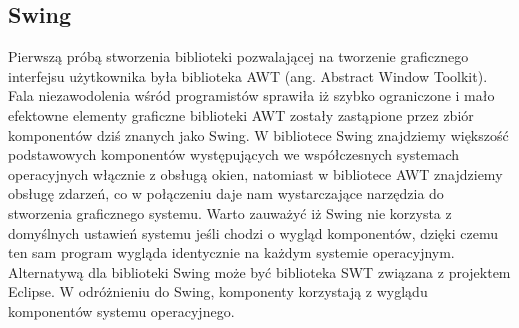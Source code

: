 \begin{par}
	\subsection{Swing}
	Pierwszą próbą stworzenia biblioteki pozwalającej na tworzenie graficznego interfejsu użytkownika była biblioteka AWT (ang. Abstract Window Toolkit).
	Fala niezawodolenia wśród programistów sprawiła iż szybko ograniczone i mało efektowne elementy graficzne biblioteki AWT zostały zastąpione przez zbiór komponentów dziś znanych jako Swing.
	W bibliotece Swing znajdziemy większość podstawowych komponentów występujących we współczesnych systemach operacyjnych włącznie z obsługą okien, natomiast w bibliotece AWT znajdziemy obsługę zdarzeń, co w połączeniu daje nam wystarczające narzędzia do stworzenia graficznego systemu.
	Warto zauważyć iż Swing nie korzysta z domyślnych ustawień systemu jeśli chodzi o wygląd komponentów, dzięki czemu ten sam program wygląda identycznie na każdym systemie operacyjnym.
	Alternatywą dla biblioteki Swing może być biblioteka SWT związana z projektem Eclipse.
	W odróżnieniu do Swing, komponenty korzystają z wyglądu komponentów systemu operacyjnego.
\end{par}
